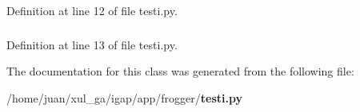 Definition at line 12 of file testi.py.
\subsubsection{}\label{classapp_1_1frogger_1_1testi_1_1SDLThread_12726d6c9e2f11f1a6ac24eb11d92413}




Definition at line 13 of file testi.py.

The documentation for this class was generated from the following file:\begin{CompactItemize}
\item 
/home/juan/xul\_\-ga/igap/app/frogger/{\bf testi.py}\end{CompactItemize}
